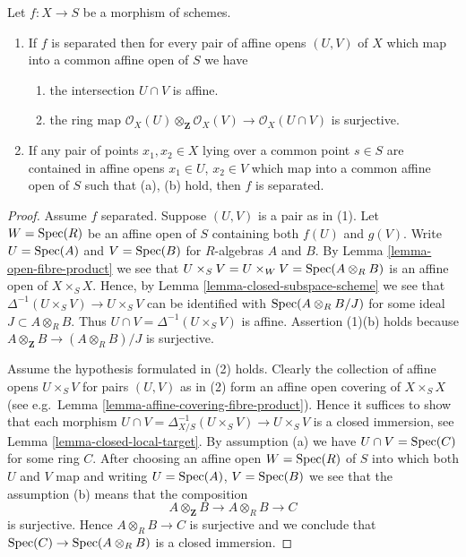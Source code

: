 \begin{lemma}
\label{lemma-characterize-separated}
Let $f : X \to S$ be a morphism of schemes.
\begin{enumerate}
\item If $f$ is separated then for every pair of affine
opens $(U, V)$ of $X$ which map into a
common affine open of $S$ we have
\begin{enumerate}
\item the intersection $U \cap V$ is affine.
\item the ring map
$\mathcal{O}_X(U) \otimes_{\mathbf{Z}} \mathcal{O}_X(V)
\to \mathcal{O}_X(U \cap V)$
is surjective.
\end{enumerate}
\item If any pair of points $x_1, x_2 \in X$ lying over a common
point $s \in S$ are contained in affine opens $x_1 \in U$,
$x_2 \in V$ which map into a common affine open of $S$ such
that (a), (b) hold, then $f$ is separated.
\end{enumerate}
\end{lemma}

\begin{proof}
Assume $f$ separated. Suppose $(U, V)$ is a pair as in (1).
Let $W = \mathop{\rm Spec}(R)$ be an affine open of $S$ containing
both $f(U)$ and $g(V)$. Write $U = \mathop{\rm Spec}(A)$ and
$V = \mathop{\rm Spec}(B)$ for $R$-algebras $A$ and $B$.
By Lemma \ref{lemma-open-fibre-product} we see that
$U \times_S V = U \times_W V = \mathop{\rm Spec}(A \otimes_R B)$
is an affine open of $X \times_S X$. Hence, by
Lemma \ref{lemma-closed-subspace-scheme} we see that
$\Delta^{-1}(U \times_S V) \to U \times_S V$
can be identified with $\mathop{\rm Spec}(A \otimes_R B/J)$
for some ideal $J \subset A \otimes_R B$.
Thus $U \cap V = \Delta^{-1}(U \times_S V)$ is affine.
Assertion (1)(b) holds because
$A \otimes_{\mathbf{Z}} B \to (A \otimes_R B)/J$ is surjective.

\medskip\noindent
Assume the hypothesis formulated in (2) holds.
Clearly the collection of affine opens $U \times_S V$
for pairs $(U, V)$ as in (2) form an affine open covering
of $X \times_S X$ (see e.g.\ Lemma \ref{lemma-affine-covering-fibre-product}).
Hence it suffices to show that each morphism
$U \cap V = \Delta_{X/S}^{-1}(U \times_S V) \to U \times_S V$
is a closed immersion, see Lemma \ref{lemma-closed-local-target}.
By assumption (a) we have $U \cap V = \mathop{\rm Spec}(C)$ for some ring $C$.
After choosing an affine open $W = \mathop{\rm Spec}(R)$ of $S$
into which both $U$ and $V$ map and writing $U = \mathop{\rm Spec}(A)$,
$V = \mathop{\rm Spec}(B)$ we see that the assumption (b) means
that the composition
$$
A \otimes_{\mathbf{Z}} B \to A \otimes_R B \to C
$$
is surjective. Hence $A \otimes_R B \to C$ is surjective and
we conclude that $\mathop{\rm Spec}(C) \to \mathop{\rm Spec}(A \otimes_R B)$
is a closed immersion.
\end{proof}

